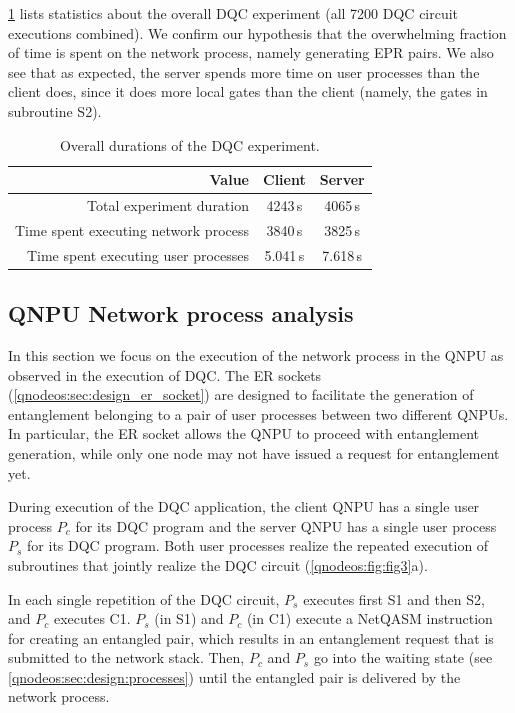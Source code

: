 \cref{tab:exp_durations} lists statistics about the overall \ac{DQC} experiment (all 7200 \ac{DQC} circuit executions combined). We confirm our hypothesis that the overwhelming fraction of time is spent on the network process, namely generating \ac{EPR} pairs. We also see that as expected, the server spends more time on user processes than the client does, since it does more local gates than the client (namely, the gates in subroutine S2).

\begin{table}[htpb]
    \centering
    \begin{tabular}{|r|c|c|}
    \hline
    \textbf{Value} & \textbf{Client} & \textbf{Server} \\ 
    \hline
    Total experiment duration & 4243\,s & 4065\,s \\
    Time spent executing network process & 3840\,s & 3825\,s \\
    Time spent executing user processes & 5.041\,s & 7.618\,s \\
    \hline
    \end{tabular}
    \caption{Overall durations of the \ac{DQC} experiment.}
    \label{tab:exp_durations}
\end{table}

\subsection{QNPU Network process analysis}

In this section we focus on the execution of the network process in the \ac{QNPU} as observed in the execution of \ac{DQC}. The \ac{ER} sockets (\cref{qnodeos:sec:design_er_socket}) are designed to facilitate the generation of entanglement belonging to a pair of user processes between two different \acp{QNPU}. In particular, the \ac{ER} socket allows the \ac{QNPU} to proceed with entanglement generation, while only one node may not have issued a request for entanglement yet. 

During execution of the \ac{DQC} application, the client \ac{QNPU} has a single user process $P_c$ for its \ac{DQC} program and the server \ac{QNPU} has a single user process $P_s$ for its \ac{DQC} program. Both user processes realize the repeated execution of subroutines that jointly realize the \ac{DQC} circuit (\cref{qnodeos:fig:fig3}a).

In each single repetition of the \ac{DQC} circuit, $P_s$ executes first S1 and then S2, and $P_c$ executes C1. $P_s$ (in S1) and $P_c$ (in C1) execute a \ac{NetQASM} instruction for creating an entangled pair, which results in an entanglement request that is submitted to the network stack. Then, $P_c$ and $P_s$ go into the waiting state (see \cref{qnodeos:sec:design:processes}) until the entangled pair is delivered by the network process.

